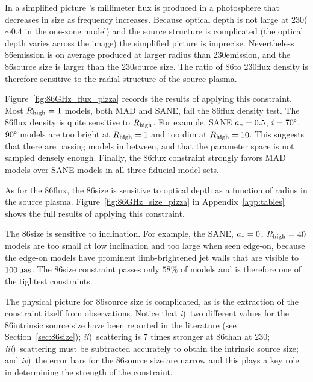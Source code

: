 
In a simplified picture \sgra's millimeter flux is produced in a photosphere that decreases in size as frequency increases.
Because optical depth is not large at 230\GHz ($\sim 0.4$ in the one-zone model) and the source structure is complicated (the optical depth varies across the image) the simplified picture is imprecise.
Nevertheless 86\GHz emission is on average produced at larger radius than 230\GHz emission, and the 86\GHz source size is larger than the 230\GHz source size.  The ratio of 86\GHz to 230\GHz flux density is therefore sensitive to the radial structure of the source plasma.

Figure~\ref{fig:86GHz_flux_pizza} records the results of applying this constraint.
Most $R_\mathrm{high} = 1$ models, both MAD and SANE, fail the 86\GHz flux density test.
The 86\GHz flux density is quite sensitive to $R_\mathrm{high}$.
For example, SANE $a_* = 0.5$, $i = 70\degree$, $90\degree$ models are too bright at $R_\mathrm{high} = 1$ and too dim at $R_\mathrm{high} = 10$.  This suggests that there are passing models in between, and that the parameter space is not sampled densely enough.
Finally, the 86\GHz flux constraint strongly favors MAD models over SANE models in all three fiducial model sets.


As for the 86\GHz flux, the 86\GHz size is sensitive to optical depth as a function of radius in the source plasma.
Figure~\ref{fig:86GHz_size_pizza} in Appendix~\ref{app:tables} shows the full results of applying this constraint.

The 86\GHz size is sensitive to inclination.
For example, the SANE, $a_* = 0$, $R_\mathrm{high} = 40$ models are too small at low inclination and too large when seen edge-on, because the edge-on models have prominent limb-brightened jet walls that are visible to $100\uas$.
The 86\GHz size constraint passes only $58\%$ of models and is therefore one of the tightest constraints.

The physical picture for 86\GHz source size is complicated, as is the extraction of the constraint itself from observations.
Notice that
\emph{i})~two different values for the 86\GHz intrinsic source size have been reported in the literature (see Section~\ref{sec:86size});
\emph{ii})~scattering is $7$ times stronger at 86\GHz than at 230\GHz;
\emph{iii})~scattering must be subtracted accurately to obtain the intrinsic source size; and
\emph{iv})~the error bars for the 86\GHz source size are narrow and this plays a key role in determining the strength of the constraint.

